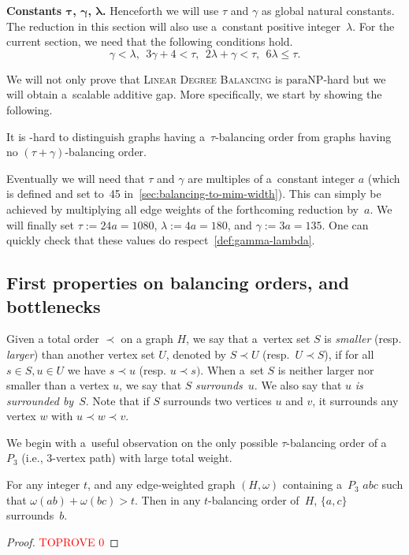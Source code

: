 \documentclass[a4paper,UKenglish,cleveref,hyperref,autoref]{lipics-v2021}
\newcommand{\paraNP}{\ensuremath{\mathrm{paraNP}}}
\newcommand{\weight}{\omega}
\newcommand{\ldb}{\textsc{Linear Degree Balancing}\xspace}
\begin{document}
\medskip

\textbf{Constants $\bm{\tau}$, $\bm{\gamma}$, $\bm{\lambda}$.}
Henceforth we will use $\tau$ and $\gamma$ as global natural constants.
The reduction in this section will also use a~constant positive integer~$\lambda$.
For the current section, we need that the following conditions hold.
\begin{equation}\label{def:gamma-lambda}
 \gamma < \lambda,~~3\gamma + 4 < \tau,~~2\lambda + \gamma < \tau,~~6 \lambda \leqslant \tau.
\end{equation}

We will not only prove that \ldb is \paraNP-hard but we will obtain a~scalable additive gap. 
More specifically, we start by showing the following.

\begin{theorem}\label{thm:ldb}
  It is \NP-hard to distinguish graphs having \mbox{a~$\tau$-balancing} order from graphs having no $(\tau + \gamma)$-balancing order.
\end{theorem}

Eventually we will need that $\tau$ and $\gamma$ are multiples of a~constant integer $a$ (which is defined and set to~45 in~\cref{sec:balancing-to-mim-width}).
This can simply be achieved by multiplying all edge weights of the forthcoming reduction by~$a$.
We will finally set $\tau := 24a = 1080$, $\lambda := 4a = 180$, and $\gamma := 3a = 135$.
One can quickly check that these values do respect~\cref{def:gamma-lambda}.

\subsection{First properties on balancing orders, and bottlenecks}

Given a total order $\prec$ on a graph $H$, we say that a~vertex set $S$ is \emph{smaller} (resp. \emph{larger}) than another vertex set $U$, denoted by $S \prec U$ (resp.~$U \prec S$), if for all $s \in S, u \in U$ we have $s \prec u$ (resp. $u \prec s)$.
When a~set $S$ is neither larger nor smaller than a vertex $u$, we say that $S$ \emph{surrounds}~$u$.
We also say that $u$ \emph{is surrounded by}~$S$.
Note that if $S$ surrounds two vertices $u$ and $v$, it surrounds any vertex $w$ with $u \prec w \prec v$.

We begin with a~useful observation on the only possible $\tau$-balancing order of a~$P_3$ (i.e., 3-vertex path) with large total weight.

\begin{lemma}\label{lem:P3-order}
For any integer $t$, and any edge-weighted graph $(H,\weight)$ containing a~$P_3$ $abc$ such that $\weight(ab) + \weight(bc) > t$.
Then in any $t$-balancing order of~$H$, $\{a, c\}$ surrounds~$b$.
\end{lemma}
\begin{proof}\textcolor{red}{TOPROVE 0}\end{proof}
\end{document}
